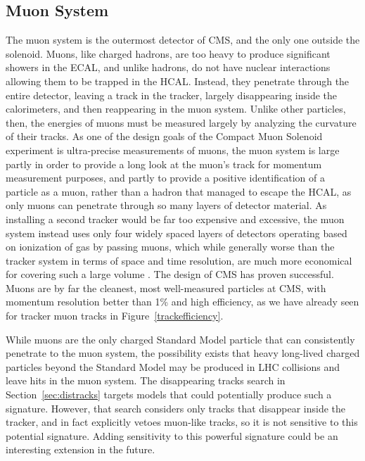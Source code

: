   \subsection{Muon System} \label{sec:muon}

  The muon system is the outermost detector of CMS, and the only one outside the solenoid.
  Muons, like charged hadrons, are too heavy to produce significant showers in the ECAL, and unlike hadrons, do not have nuclear interactions allowing them to be trapped in the HCAL.
  Instead, they penetrate through the entire detector, leaving a track in the tracker, largely disappearing inside the calorimeters, and then reappearing in the muon system.
  Unlike other particles, then, the energies of muons must be measured largely by analyzing the curvature of their tracks.
  As one of the design goals of the Compact Muon Solenoid experiment is ultra-precise measurements of muons, the muon system is large partly in order to provide a long look at the muon's track for momentum measurement purposes, and partly to provide a positive identification of a particle as a muon, rather than a hadron that managed to escape the HCAL, as only muons can penetrate through so many layers of detector material.
  As installing a second tracker would be far too expensive and excessive, the muon system instead uses only four widely spaced layers of detectors operating based on ionization of gas by passing muons, which while generally worse than the tracker system in terms of space and time resolution, are much more economical for covering such a large volume \cite{cms_tdr}.
  The design of CMS has proven successful. 
  Muons are by far the cleanest, most well-measured particles at CMS, with momentum resolution better than 1\% and high efficiency, as we have already seen for tracker muon tracks in Figure~\ref{trackefficiency}.

  While muons are the only charged Standard Model particle that can consistently penetrate to the muon system, the possibility exists that heavy long-lived charged particles beyond the Standard Model may be produced in LHC collisions and leave hits in the muon system.
  The disappearing tracks search in Section~\ref{sec:distracks} targets models that could potentially produce such a signature.
  However, that search considers only tracks that disappear inside the tracker, and in fact explicitly vetoes muon-like tracks, so it is not sensitive to this potential signature.
  Adding sensitivity to this powerful signature could be an interesting extension in the future.

